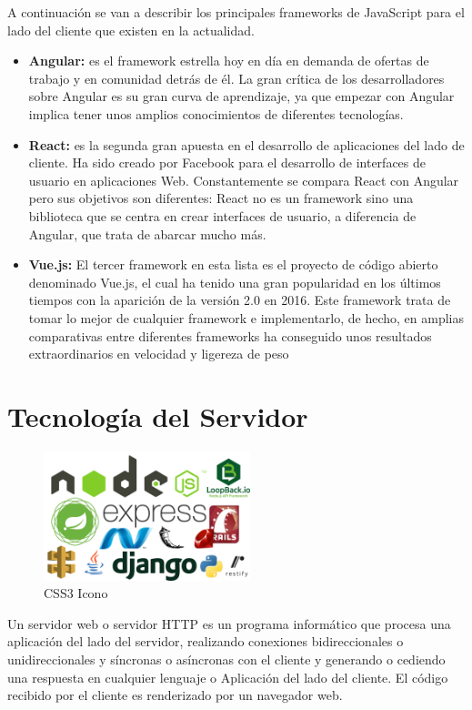 A continuación se van a describir los principales frameworks de JavaScript para el lado del cliente que existen en la actualidad.
\begin{itemize}
    \item \textbf{Angular: } es el framework estrella hoy en día en demanda de ofertas de trabajo y en comunidad detrás de él.
    La gran crítica de los desarrolladores sobre Angular es su gran curva de aprendizaje, ya que empezar con Angular implica tener unos amplios conocimientos de diferentes tecnologías.
    \item \textbf{React: }es la segunda gran apuesta en el desarrollo de aplicaciones del lado de cliente. Ha sido creado por Facebook para el desarrollo de interfaces de usuario en aplicaciones Web. Constantemente se compara React con Angular pero sus objetivos son diferentes: React no es un framework sino una biblioteca que se centra en crear interfaces de usuario, a diferencia de Angular, que trata de abarcar mucho más.
    \item \textbf{Vue.js: } El tercer framework en esta lista es el proyecto de código abierto denominado Vue.js, el cual ha tenido una gran popularidad en los últimos tiempos con la aparición de la versión 2.0 en 2016. Este framework trata de tomar lo mejor de cualquier framework e implementarlo, de hecho, en amplias comparativas entre diferentes frameworks ha conseguido unos resultados extraordinarios en velocidad y ligereza de peso
\end{itemize}
\section{Tecnología del Servidor}
\begin{figure}[!h]
    \centering
    \includegraphics[width=60mm]{img/introduccion/frameworks-backend.png}
    \caption{CSS3 Icono}
\end{figure}
Un servidor web o servidor HTTP es un programa informático que procesa una aplicación del lado del servidor, realizando conexiones bidireccionales o unidireccionales y síncronas o asíncronas con el cliente y generando o cediendo una respuesta en cualquier lenguaje o Aplicación del lado del cliente. El código recibido por el cliente es renderizado por un navegador web.

